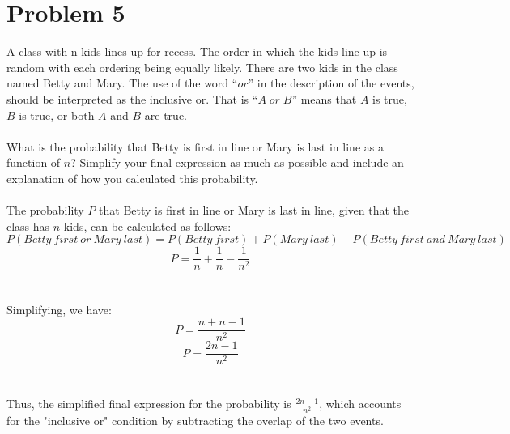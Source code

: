 \documentclass{amsart}
\theoremstyle{definition}
\theoremstyle{Exercise}
\theoremstyle{remark}
\theoremstyle{rule}
\numberwithin{equation}{section}
\begin{document}
  \section*{Problem 5}
  A class with n kids lines up for recess. The order in which the kids line up is random with each ordering being equally likely. There are two kids in the class named Betty and Mary. The use of the word ``$or$'' in the description of the events, should be interpreted as the inclusive or. That is ``$A \;or\; B$'' means that $A$ is true, $B$ is true, or both $A$ and $B$ are true.\\\\
  What is the probability that Betty is first in line or Mary is last in line as a function of $n$? Simplify your final expression as much as possible and include an explanation of how you calculated this probability.
\\\\
The probability \( P \) that Betty is first in line or Mary is last in line, given that the class has \( n \) kids, can be calculated as follows:
\[ P(Betty\ first\ or\ Mary\ last) = P(Betty\ first) + P(Mary\ last) - P(Betty\ first\ and\ Mary\ last) \]
\[ P = \frac{1}{n} + \frac{1}{n} - \frac{1}{n^2} \]\\\\
Simplifying, we have:
\[ P = \frac{n + n - 1}{n^2} \]
\[ P = \frac{2n - 1}{n^2} \]\\\\
Thus, the simplified final expression for the probability is \( \frac{2n - 1}{n^2} \), which accounts for the "inclusive or" condition by subtracting the overlap of the two events.
\\\\
  \newpage
  \section*{}
  \section*{}
\end{document}
